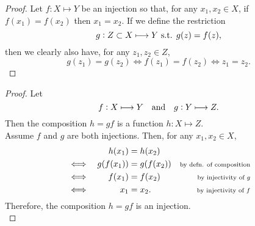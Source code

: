 \documentclass[../MathsNotesBase.tex]{subfiles}
\begin{document}
{		\bigskip
		\begin{proof}
			Let ${ f: X \longmapsto Y }$ be an injection so that, for any ${ x_1, x_2 \in X }$, if ${ f(x_1) = f(x_2) }$ then ${ x_1 = x_2 }$. If we define the restriction
			\[ g: Z \subset X \longmapsto Y \text{ s.t. } g(z) = f(z), \]
			then we clearly also have, for any ${ z_1, z_2 \in Z }$,
			\[ g(z_1) = g(z_2) \iff f(z_1) = f(z_2) \iff z_1 = z_2. \] 
		\end{proof}
		
		\bigskip
		\begin{proof}
			Let 
			\[ f: X \longmapsto Y \hspace{10pt}\text{and}\hspace{10pt} g: Y \longmapsto Z. \]
			Then the composition ${ h = gf }$ is a function ${ h: X \longmapsto Z }$.\\
			
			Assume $f$ and $g$ are both injections. Then, for any ${ x_1, x_2 \in X }$,
			\[\begin{aligned}
				&& h(x_1) &= h(x_2) \\
				&\iff & g(f(x_1)) &= g(f(x_2)) &\text{\scriptsize{by defn. of composition}} \\
				&\iff & f(x_1) &= f(x_2) &\text{\scriptsize{by injectivity of $g$}} \\
				&\iff & x_1 &= x_2. &\text{\scriptsize{by injectivity of $f$}}
			\end{aligned}\]
			Therefore, the composition $h = gf$ is an injection.\\
			

\end{proof}}
\end{document}
